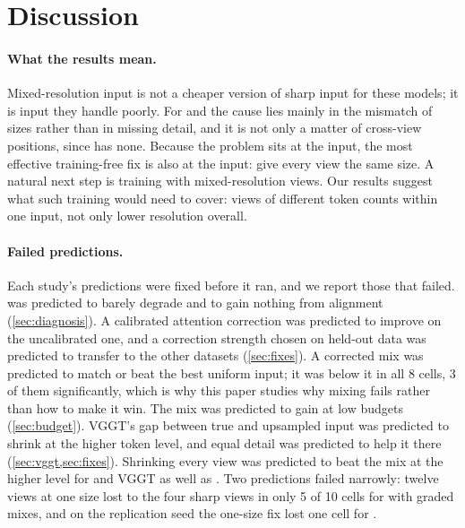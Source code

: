 \section{Discussion}
\label{sec:discussion}

\paragraph{What the results mean.}
Mixed-resolution input is not a cheaper version of sharp input for these models; it is input they handle poorly. For \pithree and \dathree the cause lies mainly in the mismatch of sizes rather than in missing detail, and it is not only a matter of cross-view positions, since \dathree has none. Because the problem sits at the input, the most effective training-free fix is also at the input: give every view the same size. A natural next step is training with mixed-resolution views. Our results suggest what such training would need to cover: views of different token counts within one input, not only lower resolution overall.

\paragraph{Failed predictions.}
Each study's predictions were fixed before it ran, and we report those that failed. \dathree was predicted to barely degrade and to gain nothing from alignment (\cref{sec:diagnosis}). A calibrated attention correction was predicted to improve on the uncalibrated one, and a correction strength chosen on held-out data was predicted to transfer to the other datasets (\cref{sec:fixes}). A corrected mix was predicted to match or beat the best uniform input; it was below it in all 8 cells, 3 of them significantly, which is why this paper studies why mixing fails rather than how to make it win. The mix was predicted to gain at low budgets (\cref{sec:budget}). VGGT's gap between true and upsampled input was predicted to shrink at the higher token level, and equal detail was predicted to help it there (\cref{sec:vggt,sec:fixes}). Shrinking every view was predicted to beat the mix at the higher level for \dathree and VGGT as well as \pithree. Two predictions failed narrowly: twelve views at one size lost to the four sharp views in only 5 of 10 cells for \dathree with graded mixes, and on the replication seed the one-size fix lost one cell for \dathree.

